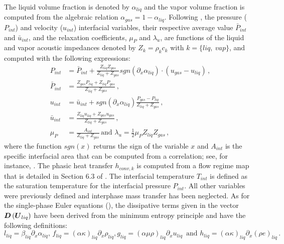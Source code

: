 \documentclass{inputs/mc2015}
\begin{document}
%
The liquid volume fraction is denoted by  $\alpha_{liq}$ and the vapor volume fraction is computed from the algebraic relation $\alpha_{gas} = 1 - \alpha_{liq}$. Following \cite{SEM}, the pressure ($P_{int}$) and velocity ($u_{int}$) interfacial variables, their respective average value $\bar{P}_{int}$ and $\bar{u}_{int}$, and the relaxation coefficients, $\mu_P$ and $\lambda_u$, are functions of the liquid and vapor acoustic impedances denoted by $Z_k = \rho_k c_k$ with $k = \{ liq, \ vap \}$, and computed with the following expressions:
%
\begin{subequations}
\label{eq:int_variables_def}
\begin{align}
  \label{E-R:83}
  P_{int} &= \bar{P}_{int} + \frac{Z_{liq}Z_{gas}}{Z_{liq}+Z_{gas}} sgn \left( \partial_x \alpha_{liq} \right) \cdot (u_{gas}-u_{liq}) \,,
  \\
  \bar{P}_{int} &= \frac{Z_{gas} P_{liq}+Z_{liq}P_{gas}}{Z_{liq}+Z_{gas}} \,,
 \\
  \label{E-R:84}
  u_{int} &= \bar{u}_{int} +  sgn \left( \partial_x \alpha_{liq}\right) \frac{P_{gas}-P_{liq}}{Z_{liq}+Z_{gas}} \,,
  \\
  \bar{u}_{int} &= \frac{Z_{liq} u_{liq}+Z_{gas} u_{gas}}{Z_{liq}+Z_{gas}} \, ,
  \\
  \mu_P &= \frac{A_{int}}{Z_{liq}+Z_{gas}} \, 
  \text{and }
  \lambda_u = \frac{1}{2} \mu_P Z_{liq} Z_{gas} \, ,
\end{align}
\end{subequations}
%
where the function $sgn(x)$ returns the sign of the variable $x$ and $A_{int}$ is the specific interfacial area that can be computed from a correlation; see, for instance, \cite{SEM}. The phasic heat transfer $h_{conv,k}$ is computed from a flow regime map that is detailed in Section 6.3 of \cite{Berry_Peterson_2014}. The interfacial temperature $T_{int}$ is defined as the saturation temperature for the interfacial pressure $P_{int}$. All other variables were previously defined and interphase mass transfer has been neglected. As for the single-phase Euler equations (), the dissipative terms given in the vector $\boldsymbol D\left( \boldsymbol U_{liq} \right)$ have been derived from the minimum entropy principle and have the following definitions:
%
\begin{subequations}
\begin{equation}
l_{liq} = \beta_{liq} \partial_x \alpha_{liq} , \, f_{liq}= ( \alpha \kappa )_{liq} \partial_x \rho_{liq} , 
\end{equation}
\begin{equation}
 g_{liq} = ( \alpha \mu \rho )_{liq} \partial_x u_{liq} \, \text{ and } h_{liq} = ( \alpha \kappa )_{liq} \partial_x \left( \rho e \right)_{liq} \, . 
\end{equation}
\end{subequations}
\end{document}
